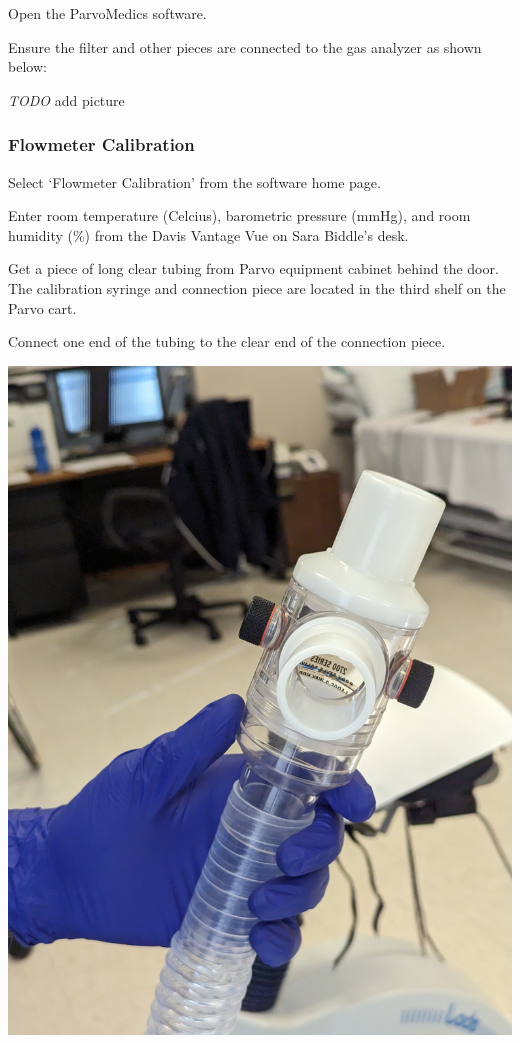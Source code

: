 \documentclass[
]{book}
\begin{document}
Open the ParvoMedics software.

Ensure the filter and other pieces are connected to the gas analyzer as shown below:

\emph{TODO} add picture

\hypertarget{ParvoCalibration-Flowmeter}{%
\subsubsection{Flowmeter Calibration}\label{ParvoCalibration-Flowmeter}}

Select `Flowmeter Calibration' from the software home page.

Enter room temperature (Celcius), barometric pressure (mmHg), and room humidity (\%) from the Davis Vantage Vue on Sara Biddle's desk.

Get a piece of long clear tubing from Parvo equipment cabinet behind the door. The calibration syringe and connection piece are located in the third shelf on the Parvo cart.

Connect one end of the tubing to the clear end of the connection piece.

\includegraphics[width=1\linewidth]{images/parvocalibration/connector_piece}
\end{document}

